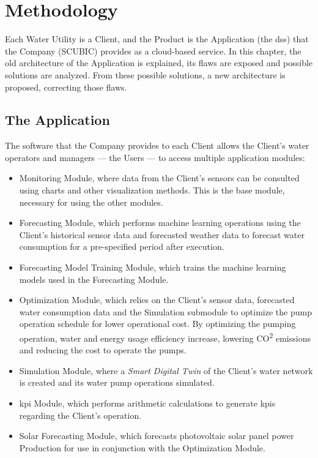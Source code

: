 \chapter{Methodology}\label{methodology}


Each Water Utility is a Client, and the Product is the Application (the \gls{dss}) that the Company (SCUBIC) provides as a cloud-based service.
In this chapter, the old architecture of the Application is explained, its flaws are exposed and possible solutions are analyzed. From these possible solutions, a new architecture is proposed, correcting those flaws.

\section{The Application}\label{methodology:s:the-aplication}

The software that the Company provides to each Client allows the Client's water operators and managers --- the Users --- to access multiple application modules:

\begin{itemize}
    \item Monitoring Module, where data from the Client's sensors can be consulted using charts and other visualization methods. This is the base module, necessary for using the other modules.
    \item Forecasting Module, which performs machine learning operations using the Client's historical sensor data and forecasted weather data to forecast water consumption for a pre-specified period after execution.
    \item Forecasting Model Training Module, which trains the machine learning models used in the Forecasting Module.
    \item Optimization Module, which relies on the Client's sensor data, forecasted water consumption data and the Simulation submodule to optimize the pump operation schedule for lower operational cost. By optimizing the pumping operation, water and energy usage efficiency increase, lowering CO\textsuperscript{2} emissions and reducing the cost to operate the pumps.
    \item Simulation Module, where a \textit{Smart Digital Twin} of the Client's water network is created and its water pump operations simulated.
    \item \gls{kpi} Module, which performs arithmetic calculations to generate \glspl{kpi} regarding the Client's operation.
    \item Solar Forecasting Module, which forecasts photovoltaic solar panel power Production for use in conjunction with the Optimization Module.
\end{itemize}  
    
